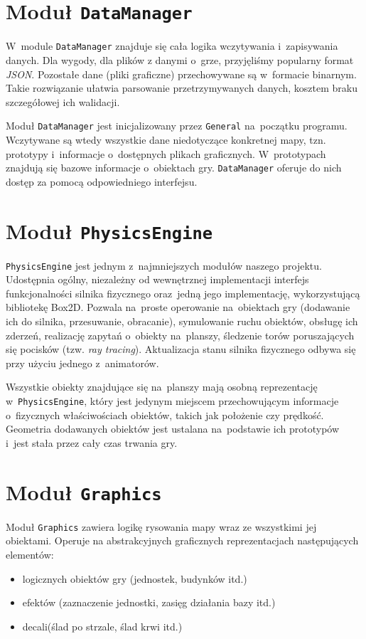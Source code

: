 \documentclass[licencjacka]{pracamgr}
\begin{document}
  \section{Moduł \texttt{DataManager}}
    W~module \texttt{DataManager} znajduje się cała logika wczytywania i~zapisywania danych. Dla wygody, dla plików z
    danymi o~grze, przyjęliśmy popularny format \emph{JSON}. Pozostałe dane (pliki graficzne) przechowywane są w~formacie
    binarnym. Takie rozwiązanie ułatwia parsowanie przetrzymywanych danych, kosztem braku szczegółowej ich walidacji.

    Moduł \texttt{DataManager} jest inicjalizowany przez \texttt{General} na~początku programu. Wczytywane są wtedy
    wszystkie dane niedotyczące konkretnej mapy, tzn. prototypy i~informacje o~dostępnych plikach graficznych.
    W~prototypach znajdują się bazowe informacje o~obiektach gry. \texttt{DataManager} oferuje do nich dostęp za pomocą
    odpowiedniego interfejsu.

  \section{Moduł \texttt{PhysicsEngine}}
    \texttt{PhysicsEngine} jest jednym z~najmniejszych modułów naszego projektu. Udostępnia ogólny, niezależny od
    wewnętrznej implementacji interfejs funkcjonalności silnika fizycznego oraz~jedną jego implementację, wykorzystującą
    bibliotekę Box2D. Pozwala na~proste operowanie na~obiektach gry (dodawanie ich do silnika, przesuwanie, obracanie),
    symulowanie ruchu obiektów, obsługę ich zderzeń, realizację zapytań o~obiekty na~planszy, śledzenie torów poruszających
    się pocisków (tzw. \emph{ray tracing}). Aktualizacja stanu silnika fizycznego odbywa się przy użyciu jednego
    z~animatorów.

    Wszystkie obiekty znajdujące się na~planszy mają osobną reprezentację w~\texttt{PhysicsEngine}, który jest jedynym
    miejscem przechowującym informacje o~fizycznych właściwościach obiektów, takich jak położenie czy prędkość. Geometria
    dodawanych obiektów jest ustalana na~podstawie ich prototypów i~jest stała przez cały czas trwania gry.

  \section{Moduł \texttt{Graphics}}
    Moduł \texttt{Graphics} zawiera logikę rysowania mapy wraz ze wszystkimi jej obiektami. Operuje na abstrakcyjnych
    graficznych reprezentacjach następujących elementów:
    \begin{itemize}
      \item logicznych obiektów gry (jednostek, budynków itd.)
      \item efektów (zaznaczenie jednostki, zasięg działania bazy itd.)
      \item decali\protect\footnotemark (ślad po strzale, ślad krwi itd.)
    \end{itemize}
\end{document}
